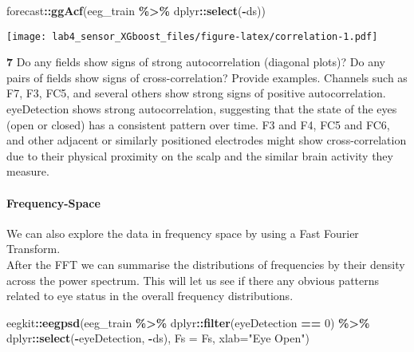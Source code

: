 \documentclass[
]{article}
\newenvironment{Shaded}{\begin{snugshade}}{\end{snugshade}}
\newcommand{\AttributeTok}[1]{\textcolor[rgb]{0.13,0.29,0.53}{#1}}
\newcommand{\DecValTok}[1]{\textcolor[rgb]{0.00,0.00,0.81}{#1}}
\newcommand{\FunctionTok}[1]{\textcolor[rgb]{0.13,0.29,0.53}{\textbf{#1}}}
\newcommand{\NormalTok}[1]{#1}
\newcommand{\SpecialCharTok}[1]{\textcolor[rgb]{0.81,0.36,0.00}{\textbf{#1}}}
\newcommand{\StringTok}[1]{\textcolor[rgb]{0.31,0.60,0.02}{#1}}
\begin{document}
\begin{Shaded}
\begin{Highlighting}[]
\NormalTok{forecast}\SpecialCharTok{::}\FunctionTok{ggAcf}\NormalTok{(eeg\_train }\SpecialCharTok{\%\textgreater{}\%}\NormalTok{ dplyr}\SpecialCharTok{::}\FunctionTok{select}\NormalTok{(}\SpecialCharTok{{-}}\NormalTok{ds))}
\end{Highlighting}
\end{Shaded}

\texttt{[image: lab4\_sensor\_XGboost\_files/figure-latex/correlation-1.pdf]}

\textbf{7} Do any fields show signs of strong autocorrelation (diagonal
plots)? Do any pairs of fields show signs of cross-correlation? Provide
examples. Channels such as F7, F3, FC5, and several others show strong
signs of positive autocorrelation. eyeDetection shows strong
autocorrelation, suggesting that the state of the eyes (open or closed)
has a consistent pattern over time. F3 and F4, FC5 and FC6, and other
adjacent or similarly positioned electrodes might show cross-correlation
due to their physical proximity on the scalp and the similar brain
activity they measure.

\paragraph{Frequency-Space}\label{frequency-space}

We can also explore the data in frequency space by using a Fast Fourier
Transform.\\
After the FFT we can summarise the distributions of frequencies by their
density across the power spectrum. This will let us see if there any
obvious patterns related to eye status in the overall frequency
distributions.

\begin{Shaded}
\begin{Highlighting}[]
\NormalTok{eegkit}\SpecialCharTok{::}\FunctionTok{eegpsd}\NormalTok{(eeg\_train }\SpecialCharTok{\%\textgreater{}\%}\NormalTok{ dplyr}\SpecialCharTok{::}\FunctionTok{filter}\NormalTok{(eyeDetection }\SpecialCharTok{==} \DecValTok{0}\NormalTok{) }\SpecialCharTok{\%\textgreater{}\%}\NormalTok{ dplyr}\SpecialCharTok{::}\FunctionTok{select}\NormalTok{(}\SpecialCharTok{{-}}\NormalTok{eyeDetection, }\SpecialCharTok{{-}}\NormalTok{ds), }\AttributeTok{Fs =}\NormalTok{ Fs, }\AttributeTok{xlab=}\StringTok{"Eye Open"}\NormalTok{)}
\end{Highlighting}
\end{Shaded}
\end{document}
